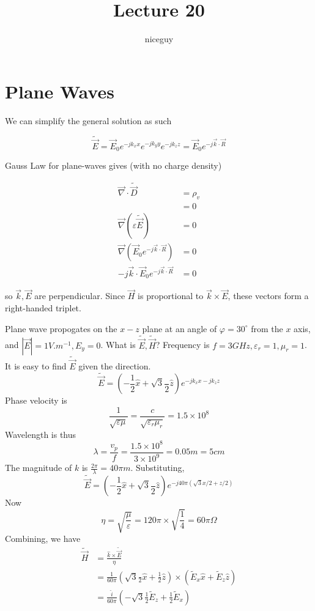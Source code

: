 \documentclass[12pt]{article}
\title{Lecture 20}
\author{niceguy}
\begin{document}
\maketitle

\section{Plane Waves}

We can simplify the general solution as such

$$\tilde{\vec E} = \vec E_0e^{-jk_xx}e^{-jk_yy}e^{-jk_zz} = \vec E_0e^{-j\vec k \cdot \vec R}$$

Gauss Law for plane-waves gives (with no charge density)

\begin{align*}
    \vec\nabla \cdot \tilde\vec D &= \rho_v \\
                                  &= 0 \\
    \vec\nabla(\varepsilon\tilde{\vec E}) &= 0 \\
    \vec\nabla(\vec E_0e^{-j\vec k \cdot \vec R}) &= 0 \\
    -j\vec k \cdot \vec E_0 e^{-j\vec k \cdot \vec R} &= 0
\end{align*}

so $\vec k, \vec E$ are perpendicular. Since $\vec H$ is proportional to $\vec k \times \vec E$, these vectors form a right-handed triplet.

\begin{ex}
    Plane wave propogates on the $x-z$ plane at an angle of $\varphi = 30^\circ$ from the $x$ axis, and $|\vec E| = 1\unit{V.m^{-1}}, E_y = 0$. What is $\tilde{\vec E}, \tilde{\vec H}$? Frequency is $f = 3\unit{GHz}, \varepsilon_r = 1, \mu_r = 1$. \\
    It is easy to find $\tilde{\vec E}$ given the direction.
    $$\tilde{\vec E} = \left(-\frac{1}{2}\hat x + \sqrt{3}\frac{}{2}\hat z\right) e^{-jk_xx-jk_zz}$$
    Phase velocity is
    $$\frac{1}{\sqrt{\varepsilon\mu}} = \frac{c}{\sqrt{\varepsilon_r\mu_r}} = 1.5 \times 10^8$$
    Wavelength is thus
    $$\lambda = \frac{v_p}{f} = \frac{1.5\times10^8}{3\times10^9} = 0.05\unit{m} = 5\unit{cm}$$
    The magnitude of $k$ is $\frac{2\pi}{\lambda} = 40\pi\unit{m}$. Substituting,
    $$\tilde{\vec E} = \left(-\frac{1}{2}\hat x + \sqrt{3}\frac{}{2}\hat z\right) e^{-j40\pi(\sqrt{3}x/2 + z/2)}$$
    Now
    $$\eta = \sqrt{\frac{\mu}{\varepsilon}} = 120\pi \times \sqrt{\frac{1}{4}} = 60\pi\unit{\Omega}$$
    Combining, we have
    \begin{align*}
        \tilde{\vec H} &= \frac{\hat k \times \tilde{\vec E}}{\eta} \\
                       &= \frac{1}{60\pi} \left(\sqrt{3}\frac{}{2}\hat x + \frac{1}{2}\hat z\right) \times (\tilde E_x\hat x + \tilde E_z\hat z) \\
                       &= \frac{\hat i}{60\pi} \left(-\sqrt{3}\frac{1}{2} \tilde E_z + \frac{1}{2} \tilde E_x\right)
    \end{align*}
\end{ex}
\end{document}
